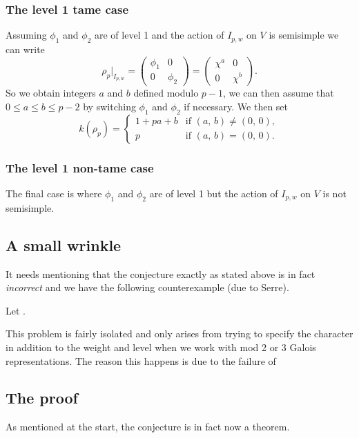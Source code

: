 \documentclass[a4paper,12pt]{article}
\begin{document}
\subsubsection{The level 1 tame case}
Assuming $\phi_1$ and $\phi_2$ are of level 1 and the action of $I_{p,w}$ on $V$ is semisimple we can write
\[
\rho_p |_{I_{p,w}} = \begin{pmatrix}
\phi_1 & 0 \\
0      & \phi_2 \end{pmatrix} = \begin{pmatrix}
\chi^a & 0 \\
0      & \chi^b \end{pmatrix}.
\]
So we obtain integers $a$ and $b$ defined modulo $p-1$, we can then assume that $0\le a \le b \le p-2$ by switching $\phi_1$ and $\phi_2$ if necessary.
We then set
\[
k(\rho_p) = \begin{cases}
1 + pa + b & \text{if }(a,\,b) \ne (0,\,0), \\
         p & \text{if }(a,\,b) = (0,\,0).
\end{cases}
\]


\subsubsection{The level 1 non-tame case}
The final case is where $\phi_1$ and $\phi_2$ are of level 1 but the action of $I_{p,w}$ on $V$ is not semisimple.

\subsection{A small wrinkle}
It needs mentioning that the conjecture exactly as stated above is in fact \emph{incorrect} and we have the following counterexample (due to Serre).

\begin{ex}
Let . %
\end{ex}

This problem is fairly isolated and only arises from trying to specify the character in addition to the weight and level when we work with mod 2 or 3 Galois representations.
The reason this happens is due to the failure of 

\subsection{The proof}
As mentioned at the start, the conjecture is in fact now a theorem.
\end{document}
